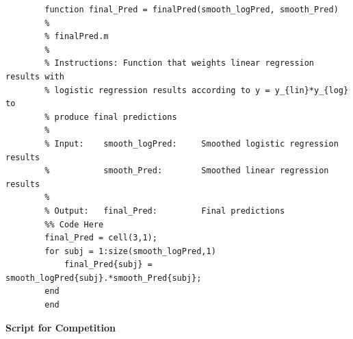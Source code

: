 \documentclass{article}
\begin{document}
	\begin{lstlisting}
		function final_Pred = finalPred(smooth_logPred, smooth_Pred)
	    %
	    % finalPred.m
	    %
	    % Instructions: Function that weights linear regression results with
	    % logistic regression results according to y = y_{lin}*y_{log} to
	    % produce final predictions
	    %
	    % Input:    smooth_logPred:     Smoothed logistic regression results
	    %           smooth_Pred:        Smoothed linear regression results
	    %
	    % Output:   final_Pred:         Final predictions
		%% Code Here
		final_Pred = cell(3,1);
		for subj = 1:size(smooth_logPred,1)
		    final_Pred{subj} = smooth_logPred{subj}.*smooth_Pred{subj};
		end
		end
	\end{lstlisting}

	\textbf{Script for Competition}\\
\end{document}
